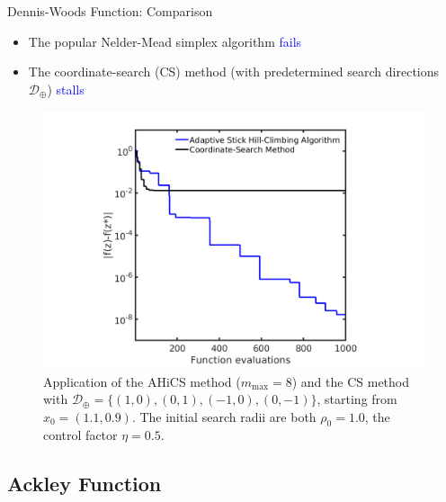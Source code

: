 \documentclass{beamer}
\begin{document}
\begin{frame}{Dennis-Woods Function: Comparison}
\begin{itemize}
	\item The popular Nelder-Mead simplex algorithm \textcolor{blue}{fails}
	\item The coordinate-search (CS) method (with predetermined search
		directions $\mathcal{D}_\oplus$) \textcolor{blue}{stalls}
\end{itemize}
\vspace{-0.35cm}
\begin{figure}[!htbp]
	\centering
	  \includegraphics[scale=0.25]{./figures/dwoods_cmp.png}
	  \caption{
	  \footnotesize{
	  Application of the AHiCS method
	  ($m_{\max}=8$) and the CS method with
	  $\mathcal{D}_{\oplus}=\{(1,0), (0,1), (-1,0), (0,-1)\}$,
	  starting from $x_0=(1.1, 0.9)$.
	  The initial search radii are both $\rho_0 = 1.0$,
	  the control factor $\eta=0.5$.}
	  }
\label{fig:dwfun:cmp}
\end{figure}
\end{frame}

\subsection{Ackley Function}
\end{document}
